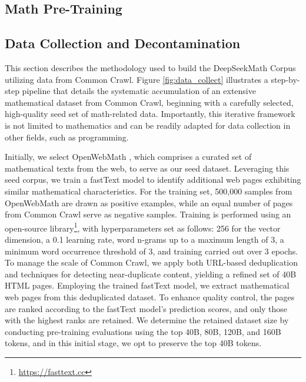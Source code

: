 \begin{itemize}[topsep=0pt]
\section{Math Pre-Training}

\subsection{Data Collection and Decontamination} This section describes the methodology used to build the DeepSeekMath Corpus utilizing data from Common Crawl. Figure \ref{fig:data_collect} illustrates a step-by-step pipeline that details the systematic accumulation of an extensive mathematical dataset from Common Crawl, beginning with a carefully selected, high-quality seed set of math-related data. Importantly, this iterative framework is not limited to mathematics and can be readily adapted for data collection in other fields, such as programming.

Initially, we select OpenWebMath \citep{openwebmath}, which comprises a curated set of mathematical texts from the web, to serve as our seed dataset. Leveraging this seed corpus, we train a fastText model \citep{joulin2016fasttext} to identify additional web pages exhibiting similar mathematical characteristics. For the training set, 500,000 samples from OpenWebMath are drawn as positive examples, while an equal number of pages from Common Crawl serve as negative samples. Training is performed using an open-source library\footnote{\url{https://fasttext.cc}}, with hyperparameters set as follows: 256 for the vector dimension, a 0.1 learning rate, word n-grams up to a maximum length of 3, a minimum word occurrence threshold of 3, and training carried out over 3 epochs. To manage the scale of Common Crawl, we apply both URL-based deduplication and techniques for detecting near-duplicate content, yielding a refined set of 40B HTML pages. Employing the trained fastText model, we extract mathematical web pages from this deduplicated dataset. To enhance quality control, the pages are ranked according to the fastText model's prediction scores, and only those with the highest ranks are retained. We determine the retained dataset size by conducting pre-training evaluations using the top 40B, 80B, 120B, and 160B tokens, and in this initial stage, we opt to preserve the top 40B tokens.


\end{itemize}
